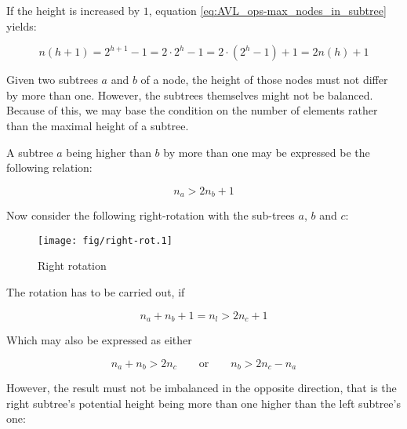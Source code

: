         If the height is increased by $1$, equation
        \ref{eq:AVL_ops-max_nodes_in_subtree} yields:

        \begin{equation}
            n(h+1)
                = 2^{h+1}-1
                = 2\cdot 2^h -1
                = 2\cdot \left(2^h-1\right) +1
                = 2n(h)+1
        \end{equation}

        Given two subtrees $a$ and $b$ of a node, the height of those nodes
        must not differ by more than one.
        However, the subtrees themselves might not be balanced.
        Because of this, we may base the condition on the number of elements
        rather than the maximal height of a subtree.

        A subtree $a$ being higher than $b$ by more than one may be expressed
        be the following relation:

        \begin{equation}
            n_a > 2n_b + 1
        \end{equation}

        Now consider the following right-rotation with the sub-trees $a$, $b$
        and $c$:

        \begin{figure}[!h]
            \caption{Right rotation}
            \label{fig:AVL_ops-rebalance-rot}
            \begin{center}
                \texttt{[image: fig/right-rot.1]}
            \end{center}
        \end{figure}

        The rotation has to be carried out, if

        \begin{equation}
            n_a + n_b + 1 = n_l > 2n_c +1
            \label{sec:AVL_ops-rebalance-rot_preq}
        \end{equation}

        Which may also be expressed as either

        \begin{equation}
            n_a + n_b > 2n_c \qquad \mathrm{or} \qquad n_b > 2n_c - n_a
        \end{equation}

        However, the result must not be imbalanced in the opposite direction,
        that is the right subtree's potential height being more than one higher
        than the left subtree's one:

